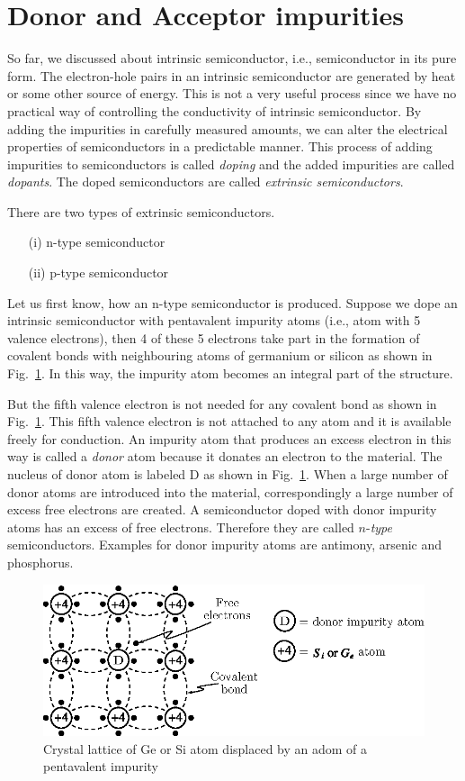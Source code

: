 \section{Donor and Acceptor impurities}\label{sec1.3}

So far, we discussed about intrinsic semiconductor, i.e., semiconductor in its pure form. The electron-hole pairs in an intrinsic semiconductor are generated by heat or some other source of energy. This is not a very useful process since we have no practical way of controlling the conductivity of intrinsic semiconductor. By adding the impurities in carefully measured amounts, we can alter the electrical properties of semiconductors in a predictable manner. This process of adding impurities to semiconductors is called {\em doping} and the added impurities are called {\em dopants}. The doped semiconductors are called {\em extrinsic semiconductors}.

There are two types of extrinsic semiconductors.
\begin{itemize}
\item[(i)] n-type semiconductor

\item[(ii)] p-type semiconductor
\end{itemize}

Let us first know, how an n-type semiconductor is produced. Suppose we dope an intrinsic semiconductor with pentavalent impurity atoms (i.e., atom with 5 valence electrons), then 4 of these 5 electrons take part in the formation of covalent bonds with neighbouring atoms of germanium or silicon as shown in Fig.~\ref{fig1.11}. In this way, the impurity atom becomes an integral part of the structure.

But the fifth valence electron is not needed for any covalent bond as shown in Fig.~\ref{fig1.11}. This fifth valence electron is not attached to any atom and it is available freely for conduction. An impurity atom that produces an excess electron in this way is called a {\em donor} atom because it donates an electron to the material. The nucleus of donor atom is labeled D as shown in Fig.~\ref{fig1.11}. When a large number of donor atoms are introduced into the material, correspondingly a large number of excess free electrons are created. A semiconductor doped with donor impurity atoms has an excess of free electrons. Therefore they are called $n$-{\em type} semiconductors. Examples for donor impurity atoms are antimony, arsenic and phosphorus.
\begin{figure}[H]
\centering
\includegraphics{chap1/fig1.11.eps}
\caption{Crystal lattice of Ge or Si atom displaced by an adom of a pentavalent impurity}\label{fig1.11}
\end{figure}

